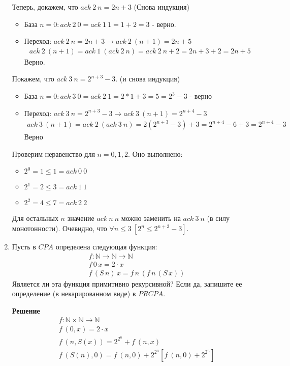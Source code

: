 \begin{enumerate}
Теперь, докажем, что $ack \ 2 \ n = 2 n + 3$ (Снова индукция)
\begin{itemize}
	\item База $n = 0 : ack \ 2 \ 0 = ack \ 1 \ 1 = 1 + 2 = 3$ - верно.
	\item Переход: $ack \ 2 \ n = 2 n + 3 \to ack \ 2 \ (n + 1) = 2 n + 5$
	\begin{align*}
		ack \ 2 \ (n + 1) = ack \ 1 \ (ack \ 2 \ n) = ack \ 2 \ n + 2 = 2 n + 3 + 2 = 2 n + 5
	\end{align*}
	Верно.
\end{itemize}

Покажем, что $ack \ 3 \ n = 2 ^ {n + 3} - 3$. (и снова индукция)
\begin{itemize}
	\item База $n = 0 : ack \ 3 \ 0  = ack \ 2 \ 1 = 2 * 1 + 3 = 5 = 2^3 - 3$ - верно
	\item Переход: $ack \ 3 \ n = 2 ^ {n + 3} - 3 \to ack \ 3 \ (n + 1) = 2 ^ {n + 4} - 3$
	\begin{align*}
		ack \ 3 \ (n + 1) = ack \ 2 \ (ack \ 3 \ n) = 2 (2 ^ {n + 3} - 3) + 3 = 2 ^ {n + 4} - 6 + 3 = 
		2 ^ {n + 4} - 3
	\end{align*}
	Верно
\end{itemize}

Проверим неравенство для $n = 0, 1, 2$. Оно выполнено:
\begin{itemize}
	\item $2^0 = 1 \le 1 = ack\ 0 \ 0$
	\item $2^1 = 2 \le 3 = ack\ 1 \ 1$
	\item $2^2 = 4 \le 7 = ack\ 2 \ 2$
\end{itemize}

Для остальных $n$ значение $ack \ n \ n$ можно заменить на $ack \ 3 \ n$ (в силу монотонности). 
Очевидно, что $\forall n \leq 3 \ \left[2^n \le 2^{n + 3} - 3\right]$. 

\item Пусть в $CPA$ определена следующая функция:
\begin{align*}
& f : \mathbb{N} \to \mathbb{N} \to \mathbb{N} \\
& f\,0\,x = 2 \cdot x \\
& f\,(S\,n)\,x = f\,n\,(f\,n\,(S\,x))
\end{align*}
Является ли эта функция примитивно рекурсивной? Если да, запишите ее определение (в некарированном виде) в 
$PRCPA$.

\textbf{Решение}
\begin{align*}
& f : \mathbb{N} \times \mathbb{N} \to \mathbb{N} \\
& f \ (0,x) = 2 \cdot x \\
& f \ (n, S(x)) = 2 ^ {2 ^ n} + f \ (n, x) \\
& f \ (S(n), 0) = f \ (n, 0) + 2 ^ {2 ^ n} \left[ f \ (n, 0) + 2 ^ {2 ^ n}\right]
\end{align*}


\end{enumerate}
